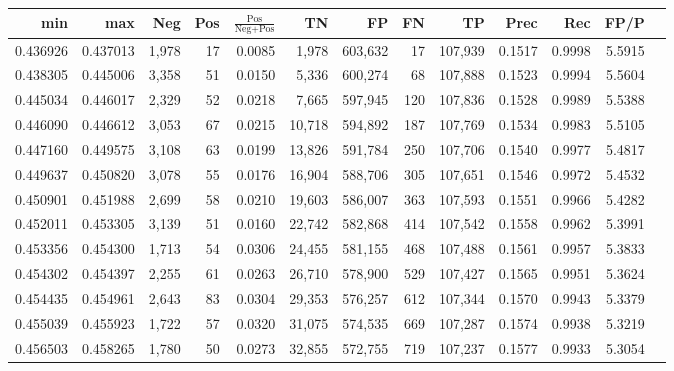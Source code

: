 \begin{tabular}{rrrrrrrrrrrrr}
\toprule
     min &      max &   Neg &   Pos & $\frac{\text{Pos}}{\text{Neg}+\text{Pos}}$ &      TN &      FP &      FN &      TP &   Prec &    Rec &   FP/P \\
\midrule
0.436926 & 0.437013 & 1,978 &    17 &                                     0.0085 &   1,978 & 603,632 &      17 & 107,939 & 0.1517 & 0.9998 & 5.5915 \\
0.438305 & 0.445006 & 3,358 &    51 &                                     0.0150 &   5,336 & 600,274 &      68 & 107,888 & 0.1523 & 0.9994 & 5.5604 \\
0.445034 & 0.446017 & 2,329 &    52 &                                     0.0218 &   7,665 & 597,945 &     120 & 107,836 & 0.1528 & 0.9989 & 5.5388 \\
0.446090 & 0.446612 & 3,053 &    67 &                                     0.0215 &  10,718 & 594,892 &     187 & 107,769 & 0.1534 & 0.9983 & 5.5105 \\
0.447160 & 0.449575 & 3,108 &    63 &                                     0.0199 &  13,826 & 591,784 &     250 & 107,706 & 0.1540 & 0.9977 & 5.4817 \\
0.449637 & 0.450820 & 3,078 &    55 &                                     0.0176 &  16,904 & 588,706 &     305 & 107,651 & 0.1546 & 0.9972 & 5.4532 \\
0.450901 & 0.451988 & 2,699 &    58 &                                     0.0210 &  19,603 & 586,007 &     363 & 107,593 & 0.1551 & 0.9966 & 5.4282 \\
0.452011 & 0.453305 & 3,139 &    51 &                                     0.0160 &  22,742 & 582,868 &     414 & 107,542 & 0.1558 & 0.9962 & 5.3991 \\
0.453356 & 0.454300 & 1,713 &    54 &                                     0.0306 &  24,455 & 581,155 &     468 & 107,488 & 0.1561 & 0.9957 & 5.3833 \\
0.454302 & 0.454397 & 2,255 &    61 &                                     0.0263 &  26,710 & 578,900 &     529 & 107,427 & 0.1565 & 0.9951 & 5.3624 \\
0.454435 & 0.454961 & 2,643 &    83 &                                     0.0304 &  29,353 & 576,257 &     612 & 107,344 & 0.1570 & 0.9943 & 5.3379 \\
0.455039 & 0.455923 & 1,722 &    57 &                                     0.0320 &  31,075 & 574,535 &     669 & 107,287 & 0.1574 & 0.9938 & 5.3219 \\
0.456503 & 0.458265 & 1,780 &    50 &                                     0.0273 &  32,855 & 572,755 &     719 & 107,237 & 0.1577 & 0.9933 & 5.3054 \\

\end{tabular}
